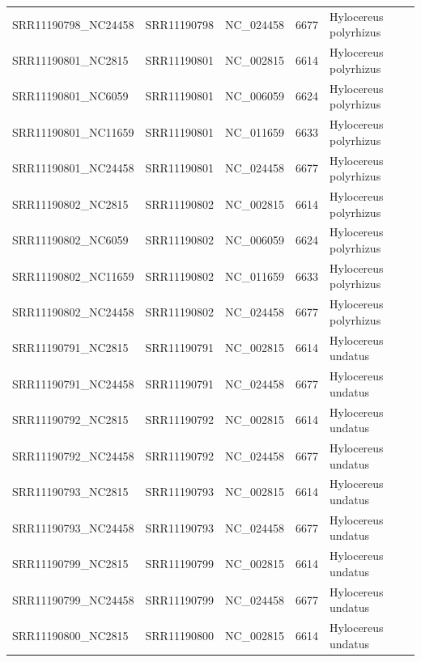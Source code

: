 \documentclass[11pt]{article}
\begin{document}
\begin{supptable}[ht]
{\begin{tabular}{lllll}
SRR11190798\_NC24458 & SRR11190798  & NC\_024458              & 6677            & Hylocereus polyrhizus \\
SRR11190801\_NC2815  & SRR11190801  & NC\_002815              & 6614            & Hylocereus polyrhizus \\
SRR11190801\_NC6059  & SRR11190801  & NC\_006059              & 6624            & Hylocereus polyrhizus \\
SRR11190801\_NC11659 & SRR11190801  & NC\_011659              & 6633            & Hylocereus polyrhizus \\
SRR11190801\_NC24458 & SRR11190801  & NC\_024458              & 6677            & Hylocereus polyrhizus \\
SRR11190802\_NC2815  & SRR11190802  & NC\_002815              & 6614            & Hylocereus polyrhizus \\
SRR11190802\_NC6059  & SRR11190802  & NC\_006059              & 6624            & Hylocereus polyrhizus \\
SRR11190802\_NC11659 & SRR11190802  & NC\_011659              & 6633            & Hylocereus polyrhizus \\
SRR11190802\_NC24458 & SRR11190802  & NC\_024458              & 6677            & Hylocereus polyrhizus \\
SRR11190791\_NC2815  & SRR11190791  & NC\_002815              & 6614            & Hylocereus undatus    \\
SRR11190791\_NC24458 & SRR11190791  & NC\_024458              & 6677            & Hylocereus undatus    \\
SRR11190792\_NC2815  & SRR11190792  & NC\_002815              & 6614            & Hylocereus undatus    \\
SRR11190792\_NC24458 & SRR11190792  & NC\_024458              & 6677            & Hylocereus undatus    \\
SRR11190793\_NC2815  & SRR11190793  & NC\_002815              & 6614            & Hylocereus undatus    \\
SRR11190793\_NC24458 & SRR11190793  & NC\_024458              & 6677            & Hylocereus undatus    \\
SRR11190799\_NC2815  & SRR11190799  & NC\_002815              & 6614            & Hylocereus undatus    \\
SRR11190799\_NC24458 & SRR11190799  & NC\_024458              & 6677            & Hylocereus undatus    \\
SRR11190800\_NC2815  & SRR11190800  & NC\_002815              & 6614            & Hylocereus undatus    \\

\end{tabular}}
\end{supptable}
\end{document}
